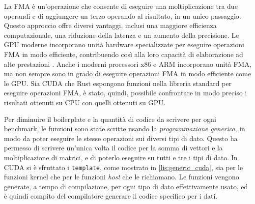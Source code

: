 
La \gls{FMA} è un'operazione che consente di eseguire una moltiplicazione tra due operandi e di aggiungere un terzo operando al risultato, in un unico passaggio. Questo approccio offre diversi vantaggi, inclusi una maggiore efficienza computazionale, una riduzione della latenza e un aumento della precisione. Le \gls{GPU} moderne incorporano unità hardware specializzate per eseguire operazioni \gls{FMA} in modo efficiente, contribuendo così alla loro capacità di elaborazione ad alte prestazioni \cite[]{NVIDIA:fma}. Anche i moderni processori x86 e ARM incorporano unità \gls{FMA}, ma non sempre sono in grado di eseguire operazioni \gls{FMA} in modo efficiente come le \gls{GPU}. Sia \gls{CUDA} che Rust espongono funzioni nella libreria standard per eseguire operazioni \gls{FMA}, è stato, quindi, possibile confrontare in modo preciso i risultati ottenuti su \gls{CPU} con quelli ottenuti su \gls{GPU}.


Per diminuire il boilerplate e la quantità di codice da scrivere per ogni benchmark, le funzioni sono state scritte usando la \textit{programmazione generica}, in modo da poter eseguire le stesse operazioni sui diversi tipi di dato. Questo ha permesso di scrivere un'unica volta il codice per la somma di vettori e la moltiplicazione di matrici, e di poterlo eseguire su tutti e tre i tipi di dato. In \gls{CUDA} si è sfruttato i \verb|template|, come mostrato in \ref{lis:generic_cuda}, sia per le funzioni kernel che per le funzioni \textit{host} che le richiamano. Le funzioni vengono generate, a tempo di compilazione, per ogni tipo di dato effettivamente usato, ed è quindi compito del compilatore generare il codice specifico per i dati.

